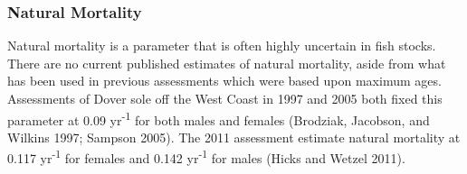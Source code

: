 \documentclass[11pt,
  english,
  a4paper,
]{article}
\begin{document}
\hypertarget{natural-mortality}{%
\subsubsection{Natural Mortality}\label{natural-mortality}}

\leavevmode\tagmcend\tagstructend


Natural mortality is a parameter that is often highly uncertain in fish stocks. There are no current published estimates of natural mortality, aside from what has been used in previous assessments which were based upon maximum ages. Assessments of Dover sole off the West Coast in 1997 and 2005 both fixed this parameter at 0.09 yr\textsuperscript{-1} for both males and females {(Brodziak, Jacobson, and Wilkins 1997; Sampson 2005)\leavevmode\tagmcend\tagstructend}. The 2011 assessment estimate natural mortality at 0.117 yr\textsuperscript{-1} for females and 0.142 yr\textsuperscript{-1} for males {(Hicks and Wetzel 2011)\leavevmode\tagmcend\tagstructend}.

\leavevmode\tagmcend\tagstructend\par

\end{document}
